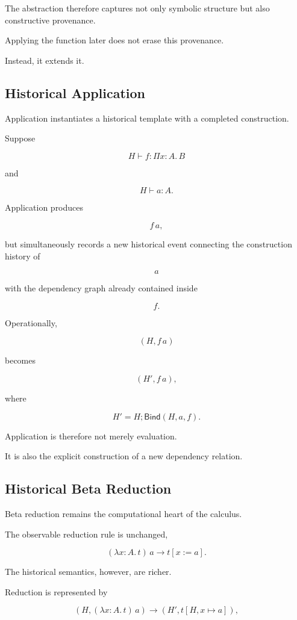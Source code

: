 \documentclass[12pt,oneside]{article}
\theoremstyle{definition}
\theoremstyle{remark}
\newcommand{\Bind}{\mathsf{Bind}}
\newcommand{\reduces}{\longrightarrow}
\begin{document}
The abstraction therefore captures not only symbolic structure but also
constructive provenance.

Applying the function later does not erase this provenance.

Instead, it extends it.

\subsection{Historical Application}

Application instantiates a historical template with a completed construction.

Suppose

\[
H
\vdash
f
:
\Pi x:A.\,B
\]

and

\[
H
\vdash
a:A.
\]

Application produces

\[
f\,a,
\]

but simultaneously records a new historical event connecting the construction
history of

\[
a
\]

with the dependency graph already contained inside

\[
f.
\]

Operationally,

\[
(H,f\,a)
\]

becomes

\[
(H',f\,a),
\]

where

\[
H'
=
H;
\Bind(H,a,f).
\]

Application is therefore not merely evaluation.

It is also the explicit construction of a new dependency relation.

\subsection{Historical Beta Reduction}

Beta reduction remains the computational heart of the calculus.

The observable reduction rule is unchanged,

\[
(\lambda x:A.\,t)\,a
\reduces
t[x:=a].
\]

The historical semantics, however, are richer.

Reduction is represented by

\[
(H,
(\lambda x:A.\,t)\,a)
\reduces
(H',
t[H,x\mapsto a]),
\]
\end{document}
